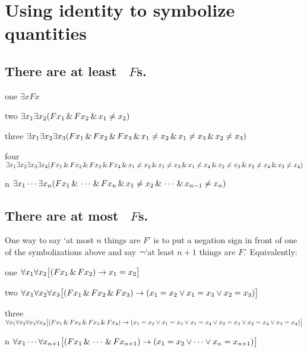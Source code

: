 
\newpage
\section*{Using identity to symbolize quantities}

\subsection*{There are at least \blank\ $F$s.}
\label{summary.atleast}

\begin{ekey}
\item[one] $\exists xFx$
\item[two] $\exists x_1\exists x_2(Fx_1 \,\&\, Fx_2 \,\&\, x_1 \neq x_2)$
\item[three] $\exists x_1\exists x_2\exists x_3(Fx_1 \,\&\, Fx_2 \,\&\, Fx_3 \,\&\, x_1 \neq x_2 \,\&\, x_1 \neq x_3 \,\&\, x_2 \neq x_3)$
\item[four] $\exists x_1\exists x_2\exists x_3\exists x_4 (Fx_1 \,\&\, Fx_2 \,\&\, Fx_3 \,\&\, Fx_4 \,\&\, x_1 \neq x_2 \,\&\, x_1 \neq x_3 \,\&\, x_1 \neq x_4 \,\&\, x_2 \neq x_3 \,\&\, x_2 \neq x_4 \,\&\, x_3 \neq x_4)$
\item[n] $\exists x_1\cdots\exists x_n(Fx_1 \,\&\,\cdots\,\&\, Fx_n \,\&\, x_1 \neq x_2 \,\&\,\cdots\,\&\, x_{n-1}\neq x_n)$ 
\end{ekey}

\subsection*{There are at most \blank\ $F$s.}
\label{summary.atmost}

One way to say `at most $n$ things are $F$' is to put a negation sign in front of one of the symbolizations above and say $\neg$`at least $n+1$ things are $F$.' Equivalently:
\begin{ekey}
\item[one] $\forall x_1\forall x_2\bigl[(Fx_1 \,\&\, Fx_2) \rightarrow x_1=x_2\bigr]$
\item[two] $\forall x_1\forall x_2\forall x_3\bigl[(Fx_1 \,\&\, Fx_2 \,\&\, Fx_3) \rightarrow (x_1=x_2 \vee x_1=x_3 \vee x_2=x_3)\bigr]$
\item[three] $\forall x_1\forall x_2\forall x_3\forall x_4\bigl[(Fx_1 \,\&\, Fx_2 \,\&\, Fx_3 \,\&\, Fx_4) \rightarrow (x_1=x_2 \vee x_1=x_3 \vee x_1=x_4 \vee x_2=x_3 \vee x_2=x_4 \vee x_3=x_4)\bigr]$
\item[n]$\forall x_1\cdots\forall x_{n+1}
\bigl[(Fx_1\,\&\, \cdots \,\&\, Fx_{n+1}) \rightarrow (x_1=x_2 \vee \cdots \vee x_n=x_{n+1})\bigr]$ 
\end{ekey}

